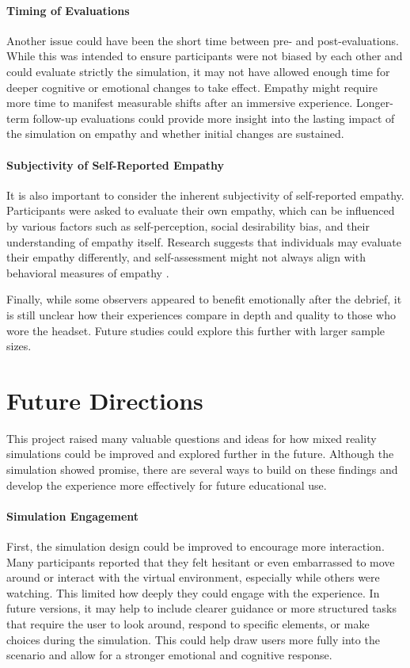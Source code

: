 \paragraph{Timing of Evaluations} Another issue could have been the short time between pre- and post-evaluations. While this was intended to ensure participants were not biased by each other and could evaluate strictly the simulation, it may not have allowed enough time for deeper cognitive or emotional changes to take effect. Empathy might require more time to manifest measurable shifts after an immersive experience. Longer-term follow-up evaluations could provide more insight into the lasting impact of the simulation on empathy and whether initial changes are sustained.

\paragraph{Subjectivity of Self-Reported Empathy} It is also important to consider the inherent subjectivity of self-reported empathy. Participants were asked to evaluate their own empathy, which can be influenced by various factors such as self-perception, social desirability bias, and their understanding of empathy itself. Research suggests that individuals may evaluate their empathy differently, and self-assessment might not always align with behavioral measures of empathy \cite{Sunahara2022}.

\vspace{1em}

Finally, while some observers appeared to benefit emotionally after the debrief, it is still unclear how their experiences compare in depth and quality to those who wore the headset. Future studies could explore this further with larger sample sizes.

\section{Future Directions}

This project raised many valuable questions and ideas for how mixed reality simulations could be improved and explored further in the future. Although the simulation showed promise, there are several ways to build on these findings and develop the experience more effectively for future educational use.

\paragraph{Simulation Engagement} First, the simulation design could be improved to encourage more interaction. Many participants reported that they felt hesitant or even embarrassed to move around or interact with the virtual environment, especially while others were watching. This limited how deeply they could engage with the experience. In future versions, it may help to include clearer guidance or more structured tasks that require the user to look around, respond to specific elements, or make choices during the simulation. This could help draw users more fully into the scenario and allow for a stronger emotional and cognitive response.

